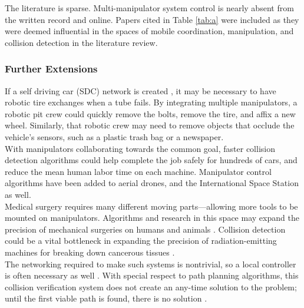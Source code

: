 \documentclass[9pt,twocolumn,twoside]{pnas-new}
\begin{document}
The literature is sparse. Multi-manipulator system control is nearly absent from the written record and online.  Papers cited in Table \ref{tab:a} were included as they were deemed influential in the spaces of mobile coordination, manipulation, and collision detection in the literature review.

\subsubsection{Further Extensions}
If a self driving car (SDC) network is created \cite{Cox:1990kc}, it may be necessary to have robotic tire exchanges when a tube fails. By integrating multiple manipulators, a robotic pit crew could quickly remove the bolts, remove the tire, and affix a new wheel. Similarly, that robotic crew may need to remove objects that occlude the vehicle's sensors, such as a plastic trash bag or a newspaper. \\
With manipulators collaborating towards the common goal, faster collision detection algorithms could help complete the job safely for hundreds of cars, and reduce the mean human labor time on each machine. Manipulator control algorithms have been added to aerial drones\cite{jimenez2013control}, and the International Space Station \cite{chen2014singularity} as well.\\
Medical surgery requires many different moving parts---allowing more tools to be mounted on manipulators. Algorithms and research in this space may expand the precision of mechanical surgeries on humans and animals \cite{latombe1999motion}. Collision detection could be a vital bottleneck in expanding the precision of radiation-emitting machines for breaking down cancerous tissues \cite{Tombropoulos:1999wl}.
\\
The networking required to make such systems is nontrivial, so a local controller is often necessary as well \cite{parker2008multiple}. With special respect to path planning algorithms, this collision verification system does not create an any-time solution to the problem; until the first viable path is found, there is no solution \cite{latombe1999motion}.


\showmatmethods{} %


\showacknow{} %



\end{document}
